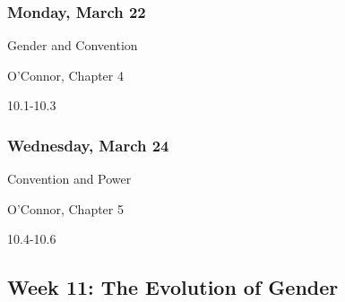 \documentclass[
]{article}
\providecommand{\tightlist}{%
  \setlength{\itemsep}{0pt}\setlength{\parskip}{0pt}}
\begin{document}
\begin{multicols}{2}

\hypertarget{monday-march-22}{%
\subsubsection{Monday, March 22}\label{monday-march-22}}

\begin{description}
\tightlist
\item[Topic]
Gender and Convention
\item[Reading]
O'Connor, Chapter 4
\item[Lectures]
10.1-10.3
\end{description}

\hypertarget{wednesday-march-24}{%
\subsubsection{Wednesday, March 24}\label{wednesday-march-24}}

\begin{description}
\tightlist
\item[Topic]
Convention and Power
\item[Reading]
O'Connor, Chapter 5
\item[Lectures]
10.4-10.6
\end{description}

\end{multicols}

\hypertarget{week-11-the-evolution-of-gender}{%
\subsection{Week 11: The Evolution of
Gender}\label{week-11-the-evolution-of-gender}}
\end{document}
